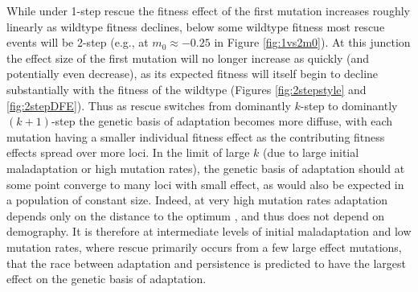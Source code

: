 \documentclass[9pt,twocolumn,twoside,lineno]{gsajnl}
\begin{document}
While under 1-step rescue the fitness effect of the first mutation increases roughly linearly as wildtype fitness declines, below some wildtype fitness most rescue events will be 2-step (e.g., at $m_0 \approx -0.25$ in Figure \ref{fig:1vs2m0}).
At this junction the effect size of the first mutation will no longer increase as quickly (and potentially even decrease), as its expected fitness will itself begin to decline substantially with the fitness of the wildtype (Figures \ref{fig:2stepstyle} and \ref{fig:2stepDFE}).
Thus as rescue switches from dominantly $k$-step to dominantly $(k+1)$-step the genetic basis of adaptation becomes more diffuse, with each mutation having a smaller individual fitness effect as the contributing fitness effects spread over more loci.
In the limit of large $k$ (due to large initial maladaptation or high mutation rates), the genetic basis of adaptation should at some point converge to many loci with small effect, as would also be expected in a population of constant size.
Indeed, at very high mutation rates adaptation depends only on the distance to the optimum \citep{anciaux2019population}, and thus does not depend on demography.
It is therefore at intermediate levels of initial maladaptation and low mutation rates, where rescue primarily occurs from a few large effect mutations, that the race between adaptation and persistence is predicted to have the largest effect on the genetic basis of adaptation.
\end{document}
